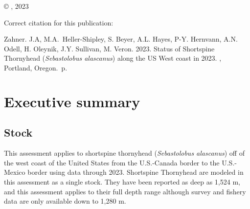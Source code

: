 \documentclass[11pt,
  english,
  letterpaper,
]{article}
\newcommand{\trTitle}{Status of Shortspine Thornyhead (\emph{Sebastolobus alascanus}) along the US West coast in 2023}
\newcommand{\trYear}{2023}
\newcommand{\trAuthsBack}{Zahner. J.A, M.A.~Heller-Shipley, S. Beyer, A.L. Hayes, P-Y. Hernvann, A.N. Odell, H. Oleynik, J.Y. Sullivan, M. Veron}
\newcommand{\trCitation}{
\begin{hangparas}{1em}{1}
\trAuthsBack{}. \trYear{}. \trTitle{}. \glsentrylong{pfmc}, Portland, Oregon. \pageref{LastPage}{}\,p.
\end{hangparas}}
\begin{document}
\thispagestyle{empty}
\vspace*{\fill}
\begin{center}
\copyright{} , \trYear{}\\
\end{center}
\par
\bigskip
\noindent
Correct citation for this publication:
\bigskip
\par
\trCitation{}
\clearpage


\tableofcontents\clearpage
\label{TRlastRoman}
\clearpage

\newpage
\thispagestyle{empty} %

\pagestyle{plain}  %
\renewcommand*{\thefootnote}{\arabic{footnote}}  %
\setcounter{footnote}{0}  %
\renewcommand{\headrulewidth}{0.5pt}
\renewcommand{\footrulewidth}{0.5pt}

\newcommand{\lt}{\ensuremath <}
\newcommand{\gt}{\ensuremath >}

\pagebreak
{}
\setcounter{page}{1}

\renewcommand{\thetable}{\roman{table}}
\renewcommand{\thefigure}{\roman{figure}}

\setlength\parskip{0.5em plus 0.1em minus 0.2em}

\hypertarget{executive-summary}{%
\section*{Executive summary}\label{executive-summary}}

\hypertarget{stock}{%
\subsection*{Stock}\label{stock}}

This assessment applies to shortspine thornyhead (\emph{Sebastolobus alascanus}) off of the west coast of the United States from the U.S.-Canada border to the U.S.-Mexico border using data through 2023. Shortspine Thornyhead are modeled in this assessment as a single stock. They have been reported as deep as 1,524 m, and this assessment applies to their full depth range although survey and fishery data are only available down to 1,280 m.
\end{document}
